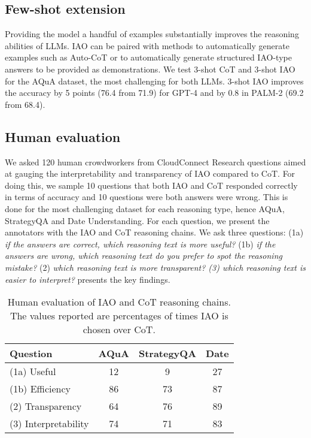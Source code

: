 \subsection{Few-shot extension}
Providing the model a handful of examples substantially improves the reasoning abilities of LLMs. IAO can be paired with methods to automatically generate examples such as Auto-CoT \cite{zhang2022automatic} or \cite{yasunaga2023large} to automatically generate structured IAO-type answers to be provided as demonstrations. We test 3-shot CoT and 3-shot IAO for the AQuA dataset, the most challenging for both LLMs. 3-shot IAO improves the accuracy by 5 points (76.4 from 71.9) for GPT-4 and by 0.8 in PALM-2 (69.2 from 68.4). 

\subsection{Human evaluation}
We asked 120 human crowdworkers from CloudConnect Research questions aimed at gauging the interpretability and transparency of IAO compared to CoT. For doing this, we sample 10 questions that both IAO and CoT responded correctly in terms of accuracy and 10 questions were both answers were wrong. This is done for the most challenging dataset for each reasoning type, hence AQuA, StrategyQA and Date Understanding. For each question, we present the annotators with the IAO and CoT reasoning chains. We ask three questions: (1a) \textit{if the answers are correct, which reasoning text is more useful?} (1b) \textit{if the answers are wrong, which reasoning text do you prefer to spot the reasoning mistake?} (2) \textit{which reasoning text is more transparent? (3) which reasoning text is easier to interpret?}  presents the key findings.
\begin{table}[h]
\centering
\begin{tabular}{@{}lccc@{}}
\toprule
\textbf{Question} & \textbf{AQuA} & \textbf{StrategyQA} & \textbf{Date} \\
\midrule
(1a) Useful         & 12 & 9 & 27 \\
(1b) Efficiency     & 86 & 73 & 87 \\
(2) Transparency    & 64 & 76 & 89 \\
(3) Interpretability & 74 & 71 & 83 \\
\bottomrule
\end{tabular}
\caption{Human evaluation of IAO and CoT reasoning chains. The values reported are percentages of times IAO is chosen over CoT.}
\label{tab:human_eval}
\end{table}
